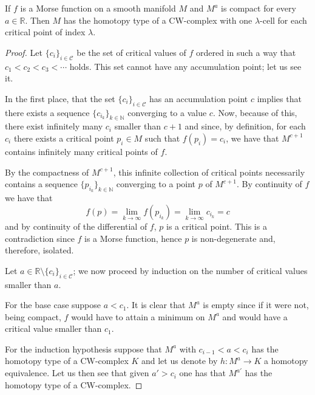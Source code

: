 \begin{theorem}\label{cwvariedad}
    If $f$ is a Morse function on a smooth manifold $M$ and $M^a$ is compact for every $a\in\mathbb{R}$. Then $M$ has the homotopy type of a CW-complex with one $\lambda$-cell for each critical point of index $\lambda$. %
\end{theorem}
\begin{proof}
    Let $\{c_i\}_{i\in \mathcal{C}}$ be the set of critical values of $f$ ordered in such a way that $c_1<c_2<c_3<\cdots$ holds. This set cannot have any accumulation point; let us see it.

    In the first place, that the set $\{c_i\}_{i\in \mathcal{C}}$ has an accumulation point $c$ implies that there exists a sequence $\{c_{i_k}\}_{k\in \mathbb{N}}$ converging to a value $c$. Now, because of this, there exist infinitely many $c_i$ smaller than $c+1$ and since, by definition, for each $c_i$ there exists a critical point $p_i\in M$ such that $f(p_i) = c_i$, we have that $M^{c+1}$ contains infinitely many critical points of $f$.

    By the compactness of $M^{c+1}$, this infinite collection of critical points necessarily contains a sequence $\{p_{i_k}\}_{k\in \mathbb{N}}$ converging to a point $p$ of $M^{c+1}$. By continuity of $f$ we have that
    \begin{equation*}
        f(p) = \lim_{k\to \infty} f(p_{i_k}) =  \lim_{k\to \infty} c_{i_k} = c
    \end{equation*}
    and by continuity of the differential of $f$, $p$ is a critical point. This is a contradiction since $f$ is a Morse function, hence $p$ is non-degenerate and, therefore, isolated.

    \medskip

    Let $a\in\mathbb{R}\setminus\{c_i\}_{i\in \mathcal{C}}$; we now proceed by induction on the number of critical values smaller than $a$.

    For the base case suppose $a<c_1$. It is clear that $M^a$ is empty since if it were not, being compact, $f$ would have to attain a minimum on $M^a$ and would have a critical value smaller than $c_1$.

    For the induction hypothesis suppose that $M^a$ with $c_{i-1}<a<c_{i}$ has the homotopy type of a CW-complex $K$ and let us denote by $h:M^a\to K$ a homotopy equivalence. Let us then see that given $a'>c_{i}$ one has that $M^{a'}$ has the homotopy type of a CW-complex.


\end{proof}
